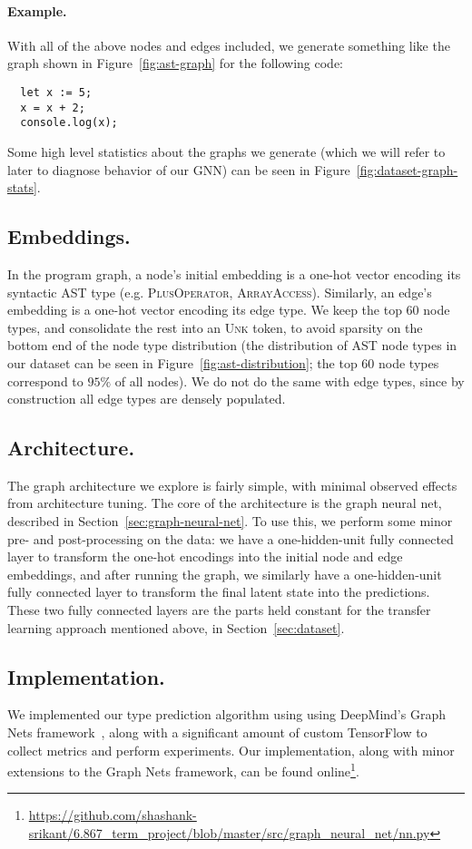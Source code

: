 \paragraph{Example.}
With all of the above nodes and edges included, we generate something like the graph shown in Figure~\ref{fig:ast-graph} for the following code:
\begin{lstlisting}
  let x := 5;
  x = x + 2;
  console.log(x);
\end{lstlisting}

Some high level statistics about the graphs we generate (which we will refer to later to diagnose behavior of our GNN) can be seen in Figure~\ref{fig:dataset-graph-stats}.

\subsection{Embeddings.}

In the program graph, a node's initial embedding is a one-hot vector encoding its syntactic AST type (e.g. \textsc{PlusOperator}, \textsc{ArrayAccess}).
Similarly, an edge's embedding is a one-hot vector encoding its edge type.
We keep the top 60 node types, and consolidate the rest into an \textsc{Unk} token, to avoid sparsity on the bottom end of the node type distribution (the distribution of AST node types in our dataset can be seen in Figure~\ref{fig:ast-distribution}; the top 60 node types correspond to $95\%$ of all nodes).
We do not do the same with edge types, since by construction all edge types are densely populated.


\subsection{Architecture.}

The graph architecture we explore is fairly simple, with minimal observed effects from architecture tuning.
The core of the architecture is the graph neural net, described in Section~\ref{sec:graph-neural-net}.
To use this, we perform some minor pre- and post-processing on the data: we have a one-hidden-unit fully connected layer to transform the one-hot encodings into the initial node and edge embeddings, and after running the graph, we similarly have a one-hidden-unit fully connected layer to transform the final latent state into the predictions.
These two fully connected layers are the parts held constant for the transfer learning approach mentioned above, in Section~\ref{sec:dataset}.

\subsection{Implementation.}

We implemented our type prediction algorithm using using DeepMind's Graph Nets framework~\cite{deepmind2018graph}, along with a significant amount of custom TensorFlow to collect metrics and perform experiments.
Our implementation, along with minor extensions to the Graph Nets framework, can be found online\footnote{\url{https://github.com/shashank-srikant/6.867_term_project/blob/master/src/graph_neural_net/nn.py}}.